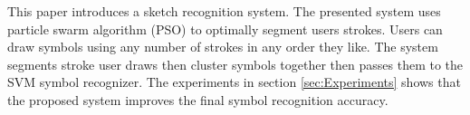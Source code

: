 \documentclass[a4paper,10pt]{IEEEconf}
\begin{document}
This paper introduces a sketch recognition system. The presented system uses particle swarm algorithm (PSO) to optimally segment users strokes. Users can draw symbols using any number of strokes in any order they like. The system segments stroke user draws then cluster symbols together then passes them to the SVM symbol recognizer. The experiments in section \ref{sec:Experiments} shows that the proposed system improves the final symbol recognition accuracy. 
\end{document}

